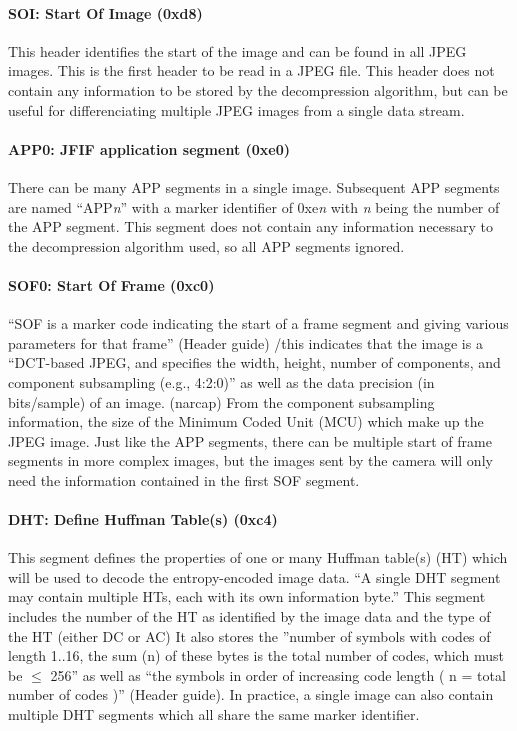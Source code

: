 \documentclass[oneside]{ecsgdp}         %
\begin{document}
\paragraph*{SOI: Start Of Image (0xd8)}
This header identifies the start of the image and can be found in all JPEG images. This is the first header to be read in a JPEG file. This header does not contain any information to be stored by the decompression algorithm, but can be useful for differenciating multiple JPEG images from a single data stream.

\paragraph*{APP0: JFIF application segment (0xe0)}
There can be many APP segments in a single image. Subsequent APP segments are named ``APP\emph{n}'' with a marker identifier of 0xe\emph{n} with \emph{n} being the number of the APP segment. This segment does not contain any information necessary to the decompression algorithm used, so all APP segments ignored.

\paragraph*{SOF0: Start Of Frame (0xc0)}
``SOF is a marker code indicating the start of a frame segment and giving various parameters for that frame'' (Header guide) /this indicates that the image is a ``DCT-based JPEG, and specifies the width, height, number of components, and component subsampling (e.g., 4:2:0)'' as well as the data precision (in bits/sample) of an image. (narcap) From the component subsampling information, the size of the Minimum Coded Unit (MCU) which make up the JPEG image. Just like the APP segments, there can be multiple start of frame segments in more complex images, but the images sent by the camera will only need the information contained in the first SOF segment.

\paragraph*{DHT: Define Huffman Table(s) (0xc4)}
This segment defines the properties of one or many Huffman table(s) (HT) which will be used to decode the entropy-encoded image data. ``A single DHT segment may contain multiple HTs, each with its own information byte.'' This segment includes the number of the HT as identified by the image data and the type of the HT (either DC or AC) It also stores the ''number of symbols with codes of length 1..16, the sum (n) of these bytes is the total number of codes, which must be $\leq$ 256'' as well as ``the symbols in order of increasing code length ( n = total number of codes )'' (Header guide). In practice, a single image can also contain multiple DHT segments which all share the same marker identifier. 
\end{document}
